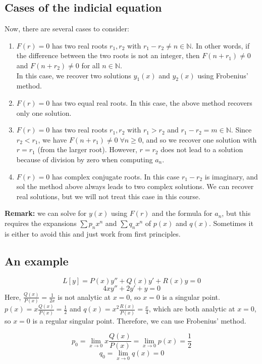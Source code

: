 \documentclass[11pt]{article}
\begin{document}
\subsection{Cases of the indicial equation}
	Now, there are several cases to consider:
		\begin{enumerate}
			\item $F(r) = 0$ has two real roots $r_1, r_2$ with $r_1 - r_2 \neq n \in \mathbb{N}$. In other words, if the difference between the two roots is not an integer, then $F(n+r_1) \neq 0$ and $F(n+r_2) \neq 0$ for all $n \in \mathbb{N}$. \\
			In this case, we recover two solutions $y_1(x)$ and $y_2(x)$ using Frobenius' method.
			\item $F(r) = 0$ has two equal real roots. In this case, the above method recovers only one solution.
			\item $F(r) = 0$ has two real roots $r_1, r_2$ with $r_1 > r_2$ and $r_1 - r_2 = m \in \mathbb{N}$. Since $r_2 < r_1$, we have $F(n+r_1) \neq 0 \; \forall n \geq 0$, and so we recover one solution with $r = r_1$ (from the larger root). However, $r=r_2$ does not lead to a solution because of division by zero when computing $a_n$.
			\item $F(r) = 0$ has complex conjugate roots. In this case $r_1 - r_2$ is imaginary, and sol the method above always leads to two complex solutions. We can recover real solutions, but we will not treat this case in this course.
		\end{enumerate}

	\textbf{Remark:} we can solve for $y(x)$ using $F(r)$ and the formula for $a_n$, but this requires the expansions $\sum p_n x^n$ and $\sum q_n x^n$ of $p(x)$ and $q(x)$. Sometimes it is either to avoid this and just work from first principles.

\subsection{An example}
		$$ L[y] = P(x)y'' + Q(x) y' + R(x) y = 0 $$
		$$ 4xy'' + 2y' + y = 0 $$
	Here, $\frac{Q(x)}{P(x)} = \frac{1}{2x}$ is not analytic at $x=0$, so $x=0$ is a singular point. $p(x) = x \frac{Q(x)}{P(x)} = \frac{1}{2}$ and $q(x) = x^2 \frac{R(x)}{P(x)} = \frac{x}{4}$, which are both analytic at $x=0$, so $x=0$ is a regular singular point. Therefore, we can use Frobenius' method.

		$$ p_0 = \lim_{x \to 0} x \frac{Q(x)}{P(x)} = \lim_{x \to 0} p(x) = \frac{1}{2} $$
		$$ q_0 = \lim_{x \to 0} q(x) = 0 $$
\end{document}
